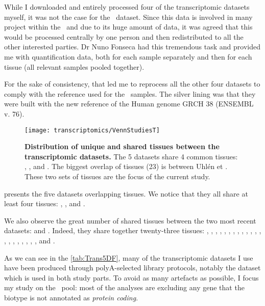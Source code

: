 While I downloaded and entirely processed four of the transcriptomic datasets
myself, it was not the case for the \Gtex\ dataset. Since this
data is involved in many project within the \EBI\ and due to its huge amount of
data, it was agreed that this would be processed centrally by one person and then
redistributed to all the other interested parties. Dr Nuno Fonseca had this
tremendous task and provided me with quantification data,
both for each sample separately and then for each tissue (all relevant samples
pooled together).

For the sake of consistency, that led me to reprocess all the other four datasets
to comply with the reference used for the \Gtex\ samples. The silver lining
was that they were built with the new reference of the
Human genome GRCH 38 (ENSEMBL v. 76).

\begin{figure}%
    \texttt{[image: transcriptomics/VennStudiesT]}\centering
    \caption[Distribution of unique and shared tissues between the
    transcriptomic datasets]
    {\label{fig:VennStudiesT}\textbf{Distribution of unique and shared tissues
    between the transcriptomic datasets.} The 5 datasets share 4
    common tissues: , ,  and
    . The biggest overlap of tissues (23) is between Uhlén et \Gtex.
    These two sets of tissues are the focus of the current study.}
\end{figure}

 presents the five datasets overlapping tissues. We notice
that they all share at least four tissues: , ,
 and .

We also observe the great number of shared tissues between the two most recent
datasets:  and . Indeed, they share together twenty-three
tissues: , , ,
, , ,
, , , ,
, , , ,
, , ,
, , , ,
 and .

As we can see in the \cref{tab:Trans5DF}, many of the transcriptomic datasets I
use have been produced through
polyA-selected library protocols, notably the  dataset which is
used in both study parts.
To avoid as many artefacts as possible, I
focus my study on the \mRNAs\ pool: most of the analyses are excluding
any gene that the biotype is not annotated as \emph{protein coding}.



